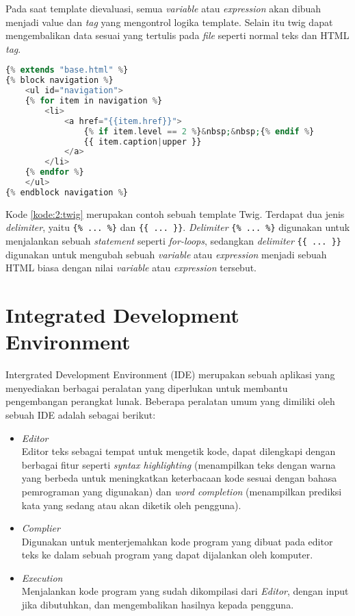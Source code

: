 Pada saat template dievaluasi, semua \textit{variable} atau \textit{expression} akan dibuah menjadi value dan \textit{tag} yang mengontrol logika template. Selain itu twig dapat mengembalikan data sesuai yang tertulis pada \textit{file} seperti normal teks dan HTML \textit{tag}.

\begin{lstlisting}[language={php}, caption={Contoh template Twig}, label={kode:2:twig}]
{% extends "base.html" %}
{% block navigation %}
	<ul id="navigation">
	{% for item in navigation %}
		<li>
			<a href="{{item.href}}">
				{% if item.level == 2 %}&nbsp;&nbsp;{% endif %}
				{{ item.caption|upper }}
			</a>
		</li>
	{% endfor %}
	</ul>
{% endblock navigation %}
\end{lstlisting}

Kode \ref{kode:2:twig} merupakan contoh sebuah template Twig. Terdapat dua jenis \textit{delimiter}, yaitu \verb|{% ... %}| dan \verb|{{ ... }}|. \textit{Delimiter} \verb|{% ... %}| digunakan untuk menjalankan sebuah \textit{statement} seperti \textit{for-loops}, sedangkan \textit{delimiter} \verb|{{ ... }}| digunakan untuk mengubah sebuah \textit{variable} atau \textit{expression} menjadi sebuah HTML biasa dengan nilai \textit{variable} atau \textit{expression} tersebut.

\section{Integrated Development Environment}
\label{sec:2:ide}

Intergrated Development Environment (IDE) merupakan sebuah aplikasi yang menyediakan berbagai peralatan yang diperlukan untuk membantu pengembangan perangkat lunak. Beberapa peralatan umum yang dimiliki oleh sebuah IDE adalah sebagai berikut:

\begin{itemize}
	\item \textit{Editor} \\
	      Editor teks sebagai tempat untuk mengetik kode, dapat dilengkapi dengan berbagai fitur seperti \textit{syntax highlighting} (menampilkan teks dengan warna yang berbeda untuk meningkatkan keterbacaan kode sesuai dengan bahasa pemrograman yang digunakan) dan \textit{word completion} (menampilkan prediksi kata yang sedang atau akan diketik oleh pengguna).
	\item \textit{Complier} \\
	      Digunakan untuk menterjemahkan kode program yang dibuat pada editor teks ke dalam sebuah program yang dapat dijalankan oleh komputer.
	\item \textit{Execution} \\
	      Menjalankan kode program yang sudah dikompilasi dari \textit{Editor}, dengan input jika dibutuhkan, dan mengembalikan hasilnya kepada pengguna.
\end{itemize}

